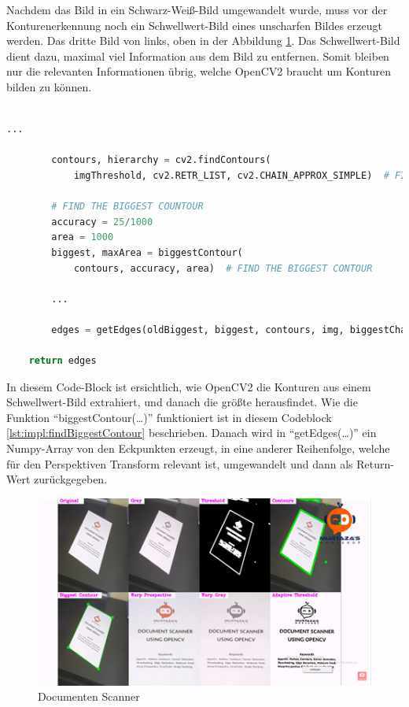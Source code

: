 Nachdem das Bild in ein Schwarz-Weiß-Bild umgewandelt wurde, muss vor der Konturenerkennung noch ein Schwellwert-Bild eines unscharfen Bildes erzeugt werden.
Das dritte Bild von links, oben in der Abbildung \ref{fig:map:documentscanner}. Das Schwellwert-Bild dient dazu, maximal viel Information aus dem Bild zu entfernen. Somit bleiben nur die relevanten Informationen übrig, welche OpenCV2 braucht um Konturen bilden zu können.\\
\\
\begin{lstlisting}[caption=Erhalten von Konturen,language=Python,label=lst:impl:getContours]
        ...

        contours, hierarchy = cv2.findContours(
            imgThreshold, cv2.RETR_LIST, cv2.CHAIN_APPROX_SIMPLE)  # FIND ALL CONTOURS

        # FIND THE BIGGEST COUNTOUR
        accuracy = 25/1000
        area = 1000
        biggest, maxArea = biggestContour(
            contours, accuracy, area)  # FIND THE BIGGEST CONTOUR

        ...

        edges = getEdges(oldBiggest, biggest, contours, img, biggestChanged)

    return edges
\end{lstlisting}

In diesem Code-Block ist ersichtlich, wie OpenCV2 die Konturen aus einem Schwellwert-Bild extrahiert,
und danach die größte herausfindet.
Wie die Funktion ``biggestContour(\dots)'' funktioniert ist in diesem Codeblock \ref{lst:impl:findBiggestContour} beschrieben. Danach wird in ``getEdges(\dots)'' ein Numpy-Array von den Eckpunkten erzeugt, in eine anderer Reihenfolge, welche für den Perspektiven Transform relevant ist, umgewandelt und dann als Return-Wert zurückgegeben.

\begin{figure}[H]
    \centering
    \includegraphics[scale=1]{pics/maperkennung/documentscanner.png}
    \caption{Documenten Scanner \cite{maai:documentscannerYoutube:cite}}
    \label{fig:map:documentscanner}
\end{figure}

